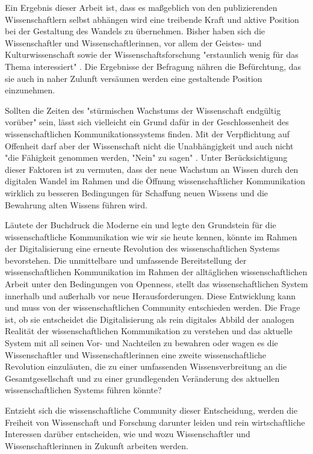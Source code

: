 Ein Ergebnis dieser Arbeit ist, dass es maßgeblich von den publizierenden Wissenschaftlern selbst abhängen wird eine treibende Kraft und aktive Position bei der Gestaltung des Wandels zu übernehmen. Bisher haben sich die Wissenschaftler und Wissenschaftlerinnen, vor allem der Geistes- und Kulturwissenschaft sowie der Wissenschaftsforschung "erstaunlich wenig für das Thema interessiert" \cite{hagner_2015_sache_buches}. Die Ergebnisse der Befragung nähren die Befürchtung, das sie auch in naher Zulunft versäumen werden eine gestaltende Position einzunehmen.

Sollten die Zeiten des "stürmischen Wachstums der Wissenschaft endgültig vorüber" \cite{K_lbel_2002} sein, lässt sich vielleicht ein Grund dafür in der Geschlossenheit des wissenschaftlichen Kommunikationssystems finden. Mit der Verpflichtung auf Offenheit darf aber der Wissenschaft nicht die Unabhängigkeit und auch nicht "die Fähigkeit genommen werden, "Nein" zu sagen" \cite{suchen_Hornbostel_2006}. Unter Berücksichtigung dieser Faktoren ist zu vermuten, dass der neue Wachstum an Wissen durch den digitalen Wandel im Rahmen und die Öffnung wissenschaftlicher Kommunikation wirklich zu besseren Bedingungen für Schaffung neuen Wissens und die Bewahrung alten Wissens führen wird.

Läutete der Buchdruck die Moderne ein und legte den Grundstein für die wissenschaftliche Kommunikation wie wir sie heute kennen, könnte im Rahmen der Digitalisierung eine erneute Revolution des wissenschaftlichen Systems bevorstehen. Die unmittelbare und umfassende Bereitstellung der wissenschaftlichen Kommunikation im Rahmen der alltäglichen wissenschaftlichen Arbeit unter den Bedingungen von Openness, stellt das wissenschaftlichen System innerhalb und außerhalb vor neue Herausforderungen.
Diese Entwicklung kann und muss von der wissenschaftlichen Community entschieden werden. Die Frage ist, ob sie entscheidet die Digitalisierung als rein digitales Abbild der analogen Realität der wissenschaftlichen Kommunikation zu verstehen und das aktuelle System mit all seinen Vor- und Nachteilen zu bewahren oder wagen es die Wissenschaftler und Wissenschaftlerinnen eine zweite wissenschaftliche Revolution einzuläuten, die zu einer umfassenden Wissensverbreitung an die Gesamtgesellschaft und zu einer grundlegenden Veränderung des aktuellen wissenschaftlichen Systems führen könnte?

Entzieht sich die wissenschaftliche Community dieser Entscheidung, werden die Freiheit von Wissenschaft und Forschung darunter leiden und rein wirtschaftliche Interessen darüber entscheiden, wie und wozu Wissenschaftler und Wissenschaftlerinnen in Zukunft arbeiten werden.

